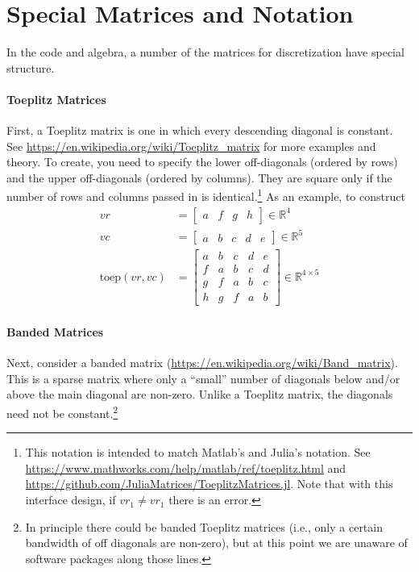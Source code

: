\documentclass[11pt]{article}
\newcommand{\R}{\ensuremath{\mathbb{R}}}
\newcommand{\toep}{\ensuremath{\mathrm{toep}}}
\theoremstyle{definition}
\begin{document}
\newpage

\appendix

\section{Special Matrices and Notation}\label{sec:special-matrices}
In the code and algebra, a number of the matrices for discretization have special structure.
\paragraph{Toeplitz Matrices}
First, a Toeplitz matrix is one in which every descending diagonal is constant.  See \url{https://en.wikipedia.org/wiki/Toeplitz_matrix} for more examples and theory. To create, you need to specify the lower off-diagonals (ordered by rows) and the upper off-diagonals (ordered by columns).  They are square only if the number of rows and columns passed in is identical.\footnote{This notation is intended to match Matlab's and Julia's notation.  See \url{https://www.mathworks.com/help/matlab/ref/toeplitz.html} and \url{https://github.com/JuliaMatrices/ToeplitzMatrices.jl}.  Note that with this interface design, if $vr_1 \neq vr_1$ there is an error.  }   As an example, to construct
\begin{align}
 vr &= \begin{bmatrix} a & f & g & h\end{bmatrix} \in \R^4\\
 vc &= \begin{bmatrix} a & b & c & d & e\end{bmatrix} \in \R^5\\
 \toep(vr,vc) &= \begin{bmatrix}
a & b & c & d & e \\
f & a & b & c & d \\
g & f & a & b & c \\
h & g & f & a & b
\end{bmatrix} \in \R^{4 \times 5}
 \end{align}

\paragraph{Banded Matrices}
Next, consider a banded matrix (\url{https://en.wikipedia.org/wiki/Band_matrix}).  This is a sparse matrix where only a ``small'' number of diagonals below and/or above the main diagonal are non-zero.  Unlike a Toeplitz matrix, the diagonals need not be constant.\footnote{In principle there could be banded Toeplitz matrices (i.e., only a certain bandwidth of off diagonals are non-zero), but at this point we are unaware of software packages along those lines.}
\end{document}
